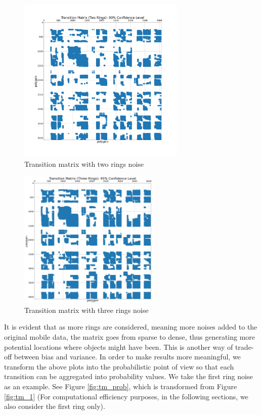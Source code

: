 \documentclass[12pt]{article}
\theoremstyle{definition}
\begin{document}
\begin{figure}
  \centering
  \includegraphics[width=8cm]{TM_2.png}
  \caption{Transition matrix with two rings noise}
  \label{fig:tm_2}
\end{figure}




\begin{figure}
  \centering
  \includegraphics[width=6.7cm]{TM_3.png}
  \caption{Transition matrix with three rings noise}
  \label{fig:tm_3}
\end{figure}


It is evident that as more rings are considered, meaning more noises added to the original mobile data, the matrix goes from sparse to dense, thus generating more potential locations where objects might have been. This is another way of trade-off between bias and variance. In order to make results more meaningful, we transform the above plots into the probabilistic point of view so that each transition can be aggregated into probability values. We take the first ring noise as an example. See Figure \ref{fig:tm_prob}, which is transformed from Figure \ref{fig:tm_1} (For computational efficiency purposes, in the following sections, we also consider the first ring only).
\end{document}
